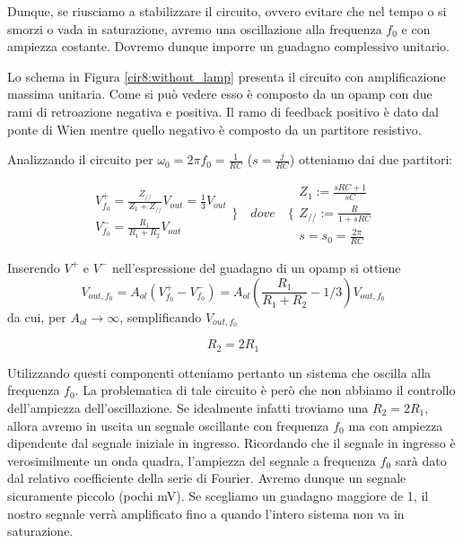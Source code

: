 Dunque, se riusciamo a stabilizzare il circuito, ovvero evitare che nel tempo o si smorzi o vada in saturazione, avremo una oscillazione alla frequenza $f_0$ e con ampiezza costante. Dovremo dunque imporre un guadagno complessivo unitario.



Lo schema in Figura \ref{cir8:without_lamp} presenta il circuito con amplificazione massima unitaria.
Come si può vedere esso è composto da un opamp con due rami di retroazione negativa e positiva.
Il ramo di feedback positivo è dato dal ponte di Wien mentre quello negativo è composto da un partitore resistivo.

Analizzando il circuito per $\omega_0=2\pi f_0=\frac{1}{RC}$ ($s=\frac{j}{RC}$) otteniamo dai due partitori:

\begin{equation}
  \begin{array}{lr}
	V^+_{f_0} = \frac{Z_{//}}{Z_1 + Z_{//}}V_{out} = \frac{1}{3}V_{out}\\
	V^-_{f_0} = \frac{R_1}{R_1+R_2}V_{out}
  \end{array} \bigg\}
\quad dove \quad %
\Bigg\{
  \begin{array}{lr}
	Z_1 := \frac{sRC+1}{sC}\\
	Z_{//} := \frac{R}{1+sRC}\\
	s = s_0 = \frac{2\pi}{RC}
  \end{array}
\end{equation}

Inserendo $V^+$ e $V^-$ nell'espressione del guadagno di un opamp si ottiene
\vspace{-2mm}
\begin{equation}
	V_{out,f_0} = A_{ol}\left( V^+_{f_0} - V^-_{f_0} \right) = A_{ol}\left(\frac{R_1}{R_1+R_2} - 1/3\right)V_{out,f_0}
\end{equation}
\vspace{-4mm}
da cui, per $A_{ol} \rightarrow \infty$, semplificando $V_{out,f_0}$

\begin{equation}
	R_2 = 2 R_1
\end{equation}

Utilizzando questi componenti otteniamo pertanto un sistema che oscilla alla frequenza $f_0$.
La problematica di tale circuito è però che non abbiamo il controllo dell'ampiezza dell'oscillazione.
Se idealmente infatti troviamo una $R_2 = 2 R_1$, allora avremo in uscita un segnale oscillante con frequenza $f_0$ ma con ampiezza dipendente dal segnale iniziale in ingresso.
Ricordando che il segnale in ingresso è verosimilmente un onda quadra, l'ampiezza del segnale a frequenza $f_0$ sarà dato dal relativo coefficiente della serie di Fourier.
Avremo dunque un segnale sicuramente piccolo (pochi \si{\milli\volt}).
Se scegliamo un guadagno maggiore de 1, il nostro segnale verrà amplificato fino a quando l'intero sistema non va in saturazione.

